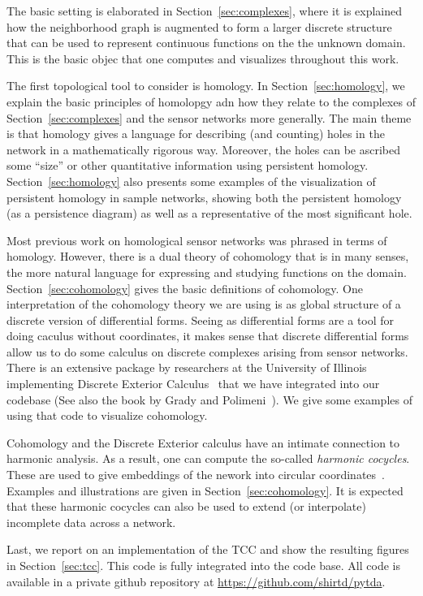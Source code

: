   The basic setting is elaborated in Section~\ref{sec:complexes}, where it is explained how the neighborhood graph is augmented to form a larger discrete structure that can be used to represent continuous functions on the the unknown domain.
  This is the basic objec that one computes and visualizes throughout this work.

  The first topological tool to consider is homology.
  In Section~\ref{sec:homology}, we explain the basic principles of homolopgy adn how they relate to the complexes of Section~\ref{sec:complexes} and the sensor networks more generally.
  The main theme is that homology gives a language for describing (and counting) holes in the network in a mathematically rigorous way.
  Moreover, the holes can be ascribed some ``size'' or other quantitative information using persistent homology.
  Section~\ref{sec:homology} also presents some examples of the visualization of persistent homology in sample networks, showing both the persistent homology (as a persistence diagram) as well as a representative of the most significant hole.

  Most previous work on homological sensor networks was phrased in terms of homology.
  However, there is a dual theory of cohomology that is in many senses, the more natural language for expressing and studying functions on the domain.
  Section~\ref{sec:cohomology} gives the basic definitions of cohomology.
  One interpretation of the cohomology theory we are using is as global structure of a discrete version of differential forms.
  Seeing as differential forms are a tool for doing caculus without coordinates, it makes sense that discrete differential forms allow us to do some calculus on discrete complexes arising from sensor networks.
  There is an extensive package by researchers at the University of Illinois implementing Discrete Exterior Calculus~\cite{bell12pydec} that we have integrated into our codebase (See also the book by Grady and Polimeni~\cite{grady10discrete}).
  We give some examples of using that code to visualize cohomology.

  Cohomology and the Discrete Exterior calculus have an intimate connection to harmonic analysis.
  As a result, one can compute the so-called \emph{harmonic cocycles}.
  These are used to give embeddings of the nework into circular coordinates~\cite{desilva09persistent}.
  Examples and illustrations are given in Section~\ref{sec:cohomology}.
  It is expected that these harmonic cocycles can also be used to extend (or interpolate) incomplete data across a network.

  Last, we report on an implementation of the TCC and show the resulting figures in Section~\ref{sec:tcc}.
  This code is fully integrated into the code base.
  All code is available in a private github repository at \url{https://github.com/shirtd/pytda}.


